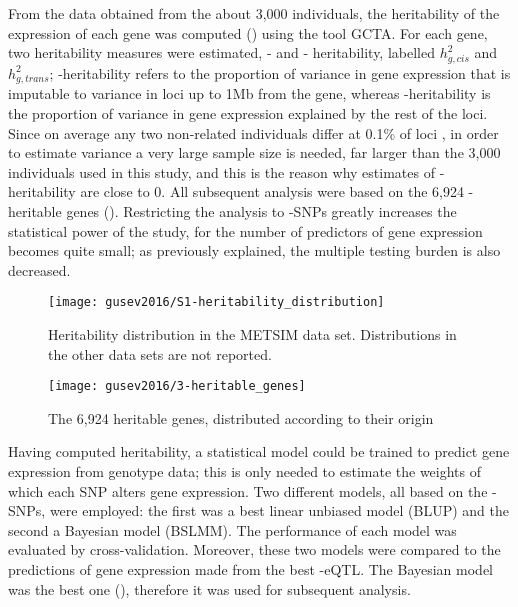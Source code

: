 \documentclass[../main.tex]{subfiles}
\begin{document}
From the data obtained from the about 3,000 individuals, the 
heritability of the expression of each gene was computed 
() using the tool GCTA\autocite{Yang2011}. For each 
gene, two heritability measures were estimated, \cis- and \trans- 
heritability, labelled $h_{g,cis}^2$ and $h_{g,trans}^2$; 
\cis-heritability refers to the proportion of variance in gene 
expression that is imputable to variance in loci up to 1Mb from the 
gene, whereas \trans-heritability is the proportion of variance in gene 
expression explained by the rest of the loci. Since on average any two 
non-related individuals differ at 0.1\% of loci \autocite{Auton2015}, in 
order to estimate \trans variance a very large sample size is needed, 
far larger than the 3,000 individuals used in this study, and this is 
the reason why estimates of \trans-heritability are close to 0. All 
subsequent analysis were based on the 6,924 \cis-heritable genes 
(). Restricting the analysis to \cis-SNPs greatly 
increases the statistical power of the study, for the number of 
predictors of gene expression becomes quite small; as previously 
explained, the multiple testing burden is also decreased.

\begin{figure}
	\texttt{[image: gusev2016/S1-heritability\_distribution]}
	\caption{Heritability distribution in the METSIM data set. 
		Distributions in the other data sets are not reported.}
\end{figure}

\begin{figure}
	\texttt{[image: gusev2016/3-heritable\_genes]}
	\caption{The 6,924 heritable genes, distributed according to their 
origin}
\end{figure}

Having computed heritability, a statistical model could be trained to 
predict gene expression from genotype data; this is only needed to 
estimate the weights of which each SNP alters gene expression. Two 
different models, all based on the \cis-SNPs, were employed: the first 
was a best linear unbiased model (BLUP) and the second a Bayesian model 
(BSLMM). The performance of each model was evaluated by 
cross-validation. Moreover, these two models were compared to the 
predictions of gene expression made from the best \cis-eQTL. The 
Bayesian model was the best one (), therefore it was 
used for subsequent analysis.
\end{document}
